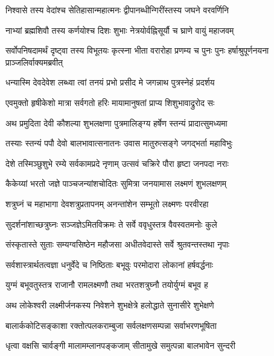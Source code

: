 \twolineshloka
{निश्वासे तस्य वेदांश्च सेतिहासान्महात्मनः}
{द्वीपानब्धीन्गिरींस्तस्य जघने वरवर्णिनि}%

\twolineshloka
{नाभ्यां ब्रह्मशिवौ तस्य कर्णयोश्च दिशः शुभाः}
{नेत्रयोर्वह्निसूर्यौ च घ्राणे वायुं महाजवम्}%


\threelineshloka
{सर्वोपनिषदामर्थं दृष्ट्वा तस्य विभूतयः}
{कृत्स्ना भीता वरारोहा प्रणम्य च पुनः पुनः}
{हर्षाश्रुपूर्णनयना प्राञ्जलिर्वाक्यमब्रवीत्}%


\twolineshloka
{धन्यास्मि देवदेवेश लब्ध्वा त्वां तनयं प्रभो}
{प्रसीद मे जगन्नाथ पुत्रस्नेहं प्रदर्शय}%


\twolineshloka
{एवमुक्तो हृषीकेशो मात्रा सर्वगतो हरिः}
{मायामानुषतां प्राप्य शिशुभावाद्रुरोद सः}%

\twolineshloka
{अथ प्रमुदिता देवी कौशल्या शुभलक्षणा}
{पुत्रमालिङ्ग्य हर्षेण स्तन्यं प्रादात्सुमध्यमा}%

\twolineshloka
{तस्याः स्तन्यं पपौ देवो बालभावात्सनातनः}
{उवास मातुरुत्सङ्गे जगद्भर्ता महाविभुः}%

\twolineshloka
{देशे तस्मिञ्छुशुभे रम्ये सर्वकामप्रदे नृणाम्}
{उत्सवं चक्रिरे पौरा हृष्टा जनपदा नराः}%

\twolineshloka
{कैकेय्यां भरतो जज्ञे पाञ्चजन्यांशचोदितः}
{सुमित्रा जनयामास लक्ष्मणं शुभलक्षणम्}%

\twolineshloka
{शत्रुघ्नं च महाभागा देवशत्रुप्रतापनम्}
{अनन्तांशेन सम्भूतो लक्ष्मणः परवीरहा}%

\twolineshloka
{सुदर्शनांशाच्छत्रुघ्नः सञ्जज्ञेऽमितविक्रमः}
{ते सर्वे ववृधुस्तत्र वैवस्वतमनोः कुले}%

\twolineshloka
{संस्कृतास्ते सुताः सम्यग्वसिष्ठेन महौजसा}
{अधीतवेदास्ते सर्वे श्रुतवन्तस्तथा नृपाः}%

\twolineshloka
{सर्वशास्त्रार्थतत्वज्ञा धनुर्वेदे च निष्ठिताः}
{बभूवुः परमोदारा लोकानां हर्षवर्द्धनाः}%

\twolineshloka
{युग्मं बभूवतुस्तत्र राजानौ रामलक्ष्मणौ}
{तथा भरतशत्रुघ्नौ तयोर्युग्मं बभूव ह}%

\twolineshloka
{अथ लोकेश्वरी लक्ष्मीर्जनकस्य निवेशने}
{शुभक्षेत्रे हलोद्धाते सुनासीरे शुभेक्षणे}%

\twolineshloka
{बालार्ककोटिसङ्काशा रक्तोत्पलकराम्बुजा}
{सर्वलक्षणसम्पन्ना सर्वाभरणभूषिता}%

\twolineshloka
{धृत्वा वक्षसि चार्वङ्गी मालामम्लानपङ्कजाम्}
{सीतामुखे समुत्पन्ना बालभावेन सुन्दरी}%

